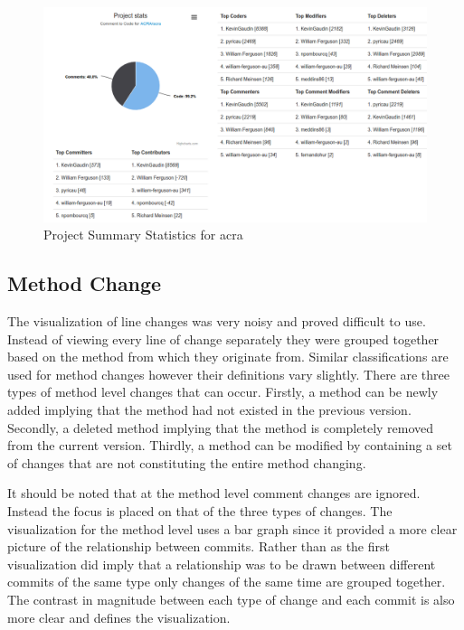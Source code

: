\begin{landscape}
\thispagestyle{empty}
 \begin{figure}
  \centering
        \includegraphics[width=1.5\textwidth]{images/table_visual}
    \caption{Project Summary Statistics for acra}
    \label{fig:project_summary_stats}
 \end{figure}
\end{landscape}
\pagestyle{plain}

\subsection{Method Change}

The visualization of line changes was very noisy and proved difficult to use. Instead of viewing every line of change separately they were grouped together based on the method from which they originate from. Similar classifications are used for method changes however their definitions vary slightly. There are three types of method level changes that can occur. Firstly, a method can be newly added implying that the method had not existed in the previous version. Secondly, a deleted method implying that the method is completely removed from the current version. Thirdly, a method can be modified by containing a set of changes that are not constituting the entire method changing. 

It should be noted that at the method level comment changes are ignored. Instead the focus is placed on that of the three types of changes. The visualization for the method level uses a bar graph since it provided a more clear picture of the relationship between commits. Rather than as the first visualization did imply that a relationship was to be drawn between different commits of the same type only changes of the same time are grouped together. The contrast in magnitude between each type of change and each commit is also more clear and defines the visualization.

